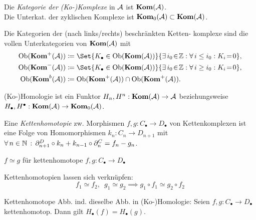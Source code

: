 \documentclass{cheat-sheet}
\newcommand{\CC}[1]{{#1}_{\bullet}} %
\begin{document}
\begin{defn}
  Die \emph{Kategorie der (Ko-)Komplexe} in $\mathcal{A}$ ist $\mathbf{Kom}(\mathcal{A})$. \\
  Die Unterkat. der zyklischen Komplexe ist $\mathbf{Kom}_0(\mathcal{A}) \subset \mathbf{Kom}(\mathcal{A})$.
\end{defn}

\begin{defn}
  Die Kategorien der (nach links/rechts) beschränkten Ketten- komplexe sind die vollen Unterkategorien von $\mathbf{Kom}(\mathcal{A})$ mit
  \begin{align*}
    \Ob(\Kom^+(\Aat)) & \coloneqq \Set{K_\bullet \in \Ob(\Kom(\Aat))}{\ex{i_0 \!\in\! \Z\!}\! \fa{i \leq i_0\!}\! K_i \!=\! 0}, \\
    \Ob(\Kom^-(\Aat)) & \coloneqq \Set{K_\bullet \in \Ob(\Kom(\Aat))}{\ex{i_0 \!\in\! \Z\!}\! \fa{i \geq i_0\!}\! K_i \!=\! 0}, \\
    \Ob(\Kom^b(\Aat)) & \coloneqq \Ob(\Kom^+(\Aat)) \cap \Ob(\Kom^+(\Aat)).
  \end{align*}
\end{defn}

\begin{prop}
  (Ko-)Homologie ist ein Funktor $H_n, H^n : \mathbf{Kom}(\mathcal{A}) \to \mathcal{A}$
  beziehungsweise $H_\bullet, H^\bullet : \mathbf{Kom}(\mathcal{A}) \to \mathbf{Kom}_0(\mathcal{A})$.
\end{prop}

\begin{defn}
  Eine \emph{Kettenhomotopie} zw. Morphismen $f, g : \CC{C} \to \CC{D}$ von Kettenkomplexen ist eine Folge von Homomorphismen $k_n : C_n \to D_{n+1}$ mit
  $\forall \, {n \in \mathbb{N}} \,:\, \partial^D_{n+1} \circ k_n + k_{n-1} \circ \partial^C_n = f_n - g_n$.
\end{defn}

\begin{nota}
  $f \simeq g$ für kettenhomotope $f, g : \CC{C} \to \CC{D}$
\end{nota}

\begin{bem}
  Kettenhomotopien lassen sich verknüpfen:
  \[ f_1 \simeq f_2, \enspace g_1 \simeq g_2 \implies g_1 \circ f_1 \simeq g_2 \circ f_2 \]
\end{bem}

\begin{lem}
  Kettenhomotope Abb. ind. dieselbe Abb. in (Ko-)Homologie:
  Seien $f, g : \CC{C} \to \CC{D}$ kettenhomotop. Dann gilt
  $H_\bullet(f) = H_\bullet(g)$.
\end{lem}
\end{document}
